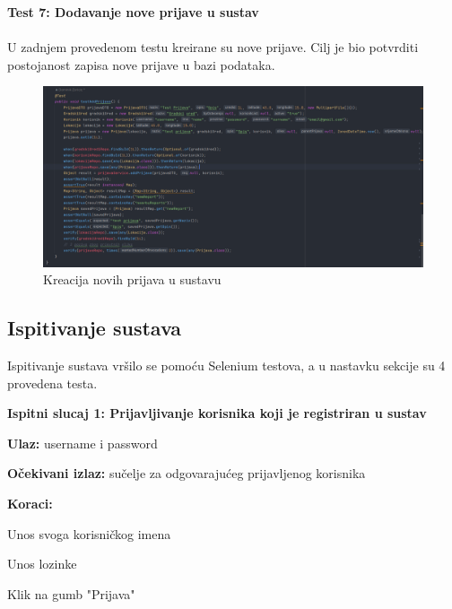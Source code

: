 		\textbf{Test 7: Dodavanje nove prijave u sustav}\\
			\\ U zadnjem provedenom testu kreirane su nove prijave. Cilj je bio potvrditi postojanost zapisa nove prijave u bazi podataka.
			
			\begin{figure}[H]
			\includegraphics[scale=0.5]{slike/addPrijava.PNG} %
			\centering
			\caption{Kreacija novih prijava u sustavu}
			\label{fig:implementacija}
		\end{figure}
			
			
			
			\subsection{Ispitivanje sustava}
			
			 Ispitivanje sustava vršilo se pomoću Selenium testova, a u nastavku sekcije su 4 provedena testa.
			 
			 \textbf{Ispitni slucaj 1: Prijavljivanje korisnika koji je registriran u sustav}
			 \begin{packed_item}
				\item \textbf{Ulaz:} username i password
				\item \textbf{Očekivani izlaz:} sučelje za odgovarajućeg prijavljenog korisnika
				\item \textbf{Koraci:}
						\begin{packed_enum}
							\item Unos svoga korisničkog imena
							\item Unos lozinke
							\item Klik na gumb "Prijava"
						\end{packed_enum}
			\end{packed_item}
			
